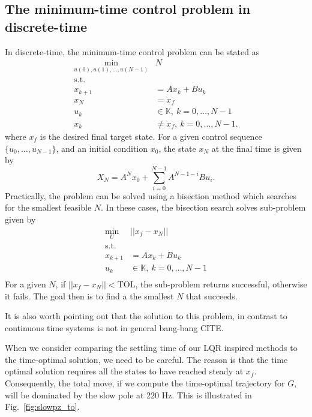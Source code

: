 \documentclass[journal,12pt,twocolumn,twoside]{IEEEtran/IEEEtran}
\begin{document}
\subsection{The minimum-time control problem in discrete-time}\label{sec:mintime}
\label{sec:org6d1d6b6}
In discrete-time, the minimum-time control problem can be stated as \cite{chen_minimumtime_cca}
\begin{align}
\min_{u(0), u(1),\dots,u(N-1)} & N\\
\text{s.t.}&\\
x_{k+1} & = Ax_{k} + Bu_{k}\\
x_{N} & = x_{f}\\
u_{k}&\in \mathds{K},~k=0,\dots,N-1\\
x_{k} &\neq x_{f},~k=0,\dots,N-1.
\end{align}
where $x_f$ is the desired final target state. 
For a given control sequence $\{u_0,\dots, u_{N-1}\}$, and an initial condition $x_0$, the state $x_N$ at the final time is given by
\begin{equation}
X_N = A^Nx_0 + \sum_{i=0}^{N-1}A^{N-1-i}Bu_i.
\end{equation}
Practically, the problem can be solved using a bisection method which searches for the smallest feasible \(N\). In these cases, the bisection search solves sub-problem given by
\begin{align}
\min_{U}& || x_{f} - x_{N}||\\
\text{s.t.} &\\
x_{k+1} & = Ax_{k} + Bu_{k}\\
u_{k}&\in \mathds{K},~k=0,\dots,N-1\\
\end{align}
For a given \(N\), if \(||x_{f} - x_{N}|| < \text{TOL}\), the sub-problem returns successful, otherwise it fails. The goal then is to find a the smallest \(N\) that succeeds. 

It is also worth pointing out that the solution to this problem, in contrast to continuous time systems is not in general bang-bang CITE.

When we consider comparing the settling time of our LQR inspired methods to the time-optimal solution, we need to be careful.
The reason is that the time optimal solution requires all the states to have reached steady at $x_f$. Consequently, the total move, if we compute the time-optimal trajectory for $G$, will be dominated by the slow pole at 220 Hz. This is illustrated in Fig.~\ref{fig:slowpz_to}.
\end{document}
